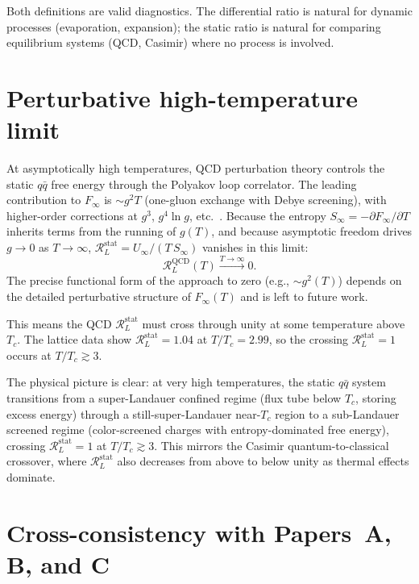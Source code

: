 \documentclass[%
 aip,
 amsmath,amssymb,
 reprint,%
]{revtex4-2}
\newcommand{\RLs}{\mathcal{R}_L^{\mathrm{stat}}}
\begin{document}
Both definitions are valid diagnostics.  The differential ratio is
natural for dynamic processes (evaporation, expansion); the static
ratio is natural for comparing equilibrium systems (QCD, Casimir)
where no process is involved.


\section{Perturbative high-temperature limit}
\label{sec:perturbative}

At asymptotically high temperatures, QCD perturbation theory
controls the static $q\bar{q}$ free energy through the Polyakov
loop correlator.  The leading contribution to $F_{\infty}$ is
$\sim g^2 T$ (one-gluon exchange with Debye screening),
with higher-order corrections at $g^3$, $g^4\ln g$,
etc.~\cite{Linde1980,BraatenNieto1996,KZ2005a}.
Because the entropy $S_{\infty} = -\partial F_{\infty}/\partial T$
inherits terms from the running of $g(T)$, and because
asymptotic freedom drives $g \to 0$ as $T \to \infty$,
$\RLs = U_{\infty}/(T\,S_{\infty})$ vanishes
in this limit:
\begin{equation}
\mathcal{R}_L^{\mathrm{QCD}}(T)
\xrightarrow{T \to \infty} 0.
\end{equation}
The precise functional form of the approach to zero (e.g.,
$\sim g^2(T)$) depends on the detailed perturbative structure
of $F_{\infty}(T)$ and is left to future work.

This means the QCD $\RLs$ must cross through unity at some
temperature above $T_c$.  The lattice data show
$\RLs = 1.04$ at $T/T_c = 2.99$, so the crossing
$\RLs = 1$ occurs at $T/T_c \gtrsim 3$.

The physical picture is clear: at very high temperatures, the static
$q\bar{q}$ system transitions from a super-Landauer confined regime
(flux tube below $T_c$, storing excess energy) through a
still-super-Landauer near-$T_c$ region to a sub-Landauer screened
regime (color-screened charges with entropy-dominated free energy),
crossing $\RLs = 1$ at $T/T_c \gtrsim 3$.  This
mirrors the Casimir quantum-to-classical crossover, where
$\RLs$ also decreases from above to below unity as
thermal effects dominate.


\section{Cross-consistency with Papers~A, B, and C}
\end{document}
